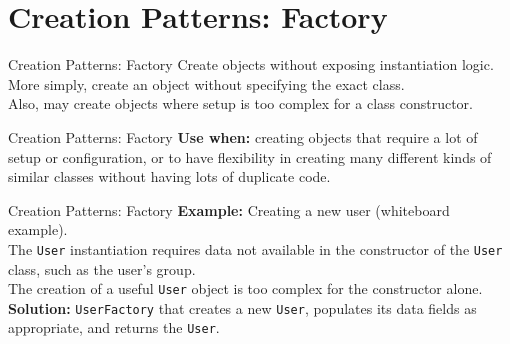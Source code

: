 \documentclass[14pt,aspectratio=169]{beamer}
\begin{document}
\section*{Creation Patterns: Factory}



\begin{frame}{Creation Patterns: Factory}
Create objects without exposing instantiation logic. \\
\vspace{1em}
More simply, create an object without specifying the exact class. \\
\vspace{1em} 
Also, may create objects where setup is too complex for a class constructor.
\end{frame}



\begin{frame}{Creation Patterns: Factory}
\large
\textbf{Use when:} creating objects that require a lot of setup or configuration, or to have flexibility in creating many different kinds of similar classes without having lots of duplicate code.
\end{frame}



\begin{frame}{Creation Patterns: Factory}
\textbf{Example:} Creating a new user (whiteboard example). \\
\vspace{1em}
The \texttt{User} instantiation requires data not available in the constructor of the \texttt{User} class, such as the user's group. \\
\vspace{1em}
The creation of a useful \texttt{User} object is too complex for the constructor alone. \\
\vspace{1em}
\textbf{Solution:} \texttt{UserFactory} that creates a new \texttt{User}, populates its data fields as appropriate, and returns the \texttt{User}.
\end{frame}
\end{document}
